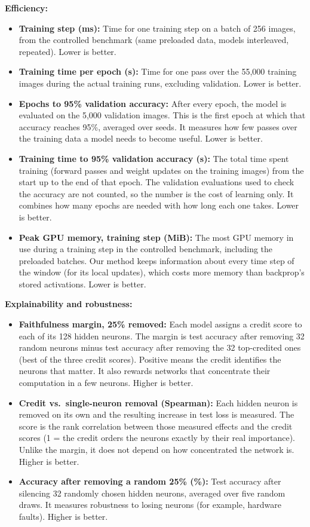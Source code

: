 \documentclass{article}
\begin{document}
{\noindent\textbf{Efficiency:}
\begin{itemize}
  \item \textbf{Training step (ms):} Time for one training step on a batch of 256 images, from the controlled benchmark (same preloaded data, models interleaved, repeated). Lower is better.
  \item \textbf{Training time per epoch (s):} Time for one pass over the 55,000 training images during the actual training runs, excluding validation. Lower is better.
  \item \textbf{Epochs to 95\% validation accuracy:} After every epoch, the model is evaluated on the 5,000 validation images. This is the first epoch at which that accuracy reaches 95\%, averaged over seeds. It measures how few passes over the training data a model needs to become useful. Lower is better.
  \item \textbf{Training time to 95\% validation accuracy (s):} The total time spent training (forward passes and weight updates on the training images) from the start up to the end of that epoch. The validation evaluations used to check the accuracy are not counted, so the number is the cost of learning only. It combines how many epochs are needed with how long each one takes. Lower is better.
  \item \textbf{Peak GPU memory, training step (MiB):} The most GPU memory in use during a training step in the controlled benchmark, including the preloaded batches. Our method keeps information about every time step of the window (for its local updates), which costs more memory than backprop's stored activations. Lower is better.
\end{itemize}

\noindent\textbf{Explainability and robustness:}
\begin{itemize}
  \item \textbf{Faithfulness margin, 25\% removed:} Each model assigns a credit score to each of its 128 hidden neurons. The margin is test accuracy after removing 32 random neurons minus test accuracy after removing the 32 top-credited ones (best of the three credit scores). Positive means the credit identifies the neurons that matter. It also rewards networks that concentrate their computation in a few neurons. Higher is better.
  \item \textbf{Credit vs.\ single-neuron removal (Spearman):} Each hidden neuron is removed on its own and the resulting increase in test loss is measured. The score is the rank correlation between those measured effects and the credit scores (1 = the credit orders the neurons exactly by their real importance). Unlike the margin, it does not depend on how concentrated the network is. Higher is better.
  \item \textbf{Accuracy after removing a random 25\% (\%):} Test accuracy after silencing 32 randomly chosen hidden neurons, averaged over five random draws. It measures robustness to losing neurons (for example, hardware faults). Higher is better.
\end{itemize}

}
\end{document}
